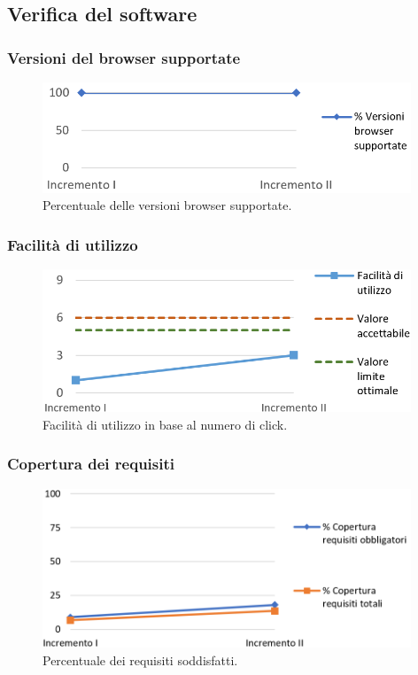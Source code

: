 \subsection{Verifica del software}

\subsubsection{Versioni del browser supportate}
\begin{figure}[h]
	\centering
	\includegraphics[width=11cm]{Images/vBrowser}
	\caption{Percentuale delle versioni browser supportate.}
\end{figure}

\subsubsection{Facilità di utilizzo}
\begin{figure}[h]
	\centering
	\includegraphics[width=11cm]{Images/facUtilizzo}
	\caption{Facilità di utilizzo in base al numero di click.}
\end{figure}

\subsubsection{Copertura dei requisiti}
\begin{figure}[h]
	\centering
	\includegraphics[width=11cm]{Images/copRequisiti}
	\caption{Percentuale dei requisiti soddisfatti.}
\end{figure}

